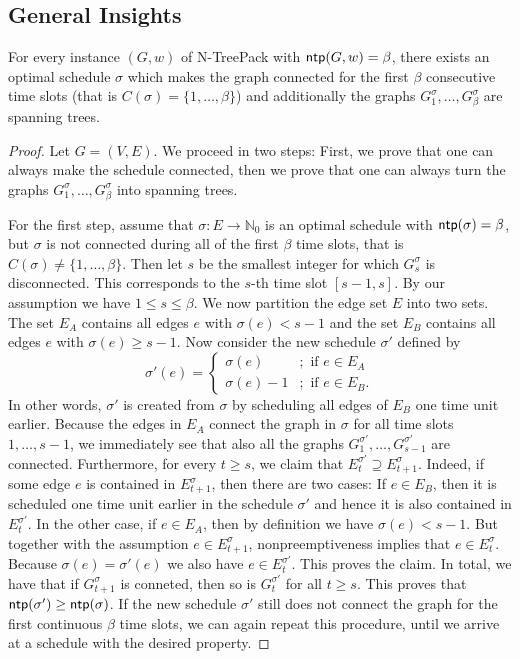 \documentclass[runningheads]{llncs}
\newcommand{\NN}{\mathbb{N}}
\newcommand{\set}[1]{\{ #1 \}}
\newcommand{\fromto}[2]{\set{#1, \ldots, #2}}
\newcommand{\xxxNTP}{{\sc N-TreePack}}
\DeclareMathOperator{\ntp}{\text{\sf ntp}}
\newcommand{\lasse}[1]{#1}
\begin{document}
\subsection{\lasse{General Insights}}

\begin{lemma}
\label{le:structure}
For every instance $(G,w)$ of {\xxxNTP} with $\ntp(G,w)=\lasse{\beta}$, there exists an optimal schedule $\sigma$ 
\lasse{which makes the graph connected for the first $\beta$ consecutive time slots (that is $C(\sigma) = \fromto{1}{\beta}$)} and additionally the graphs $G^\sigma_1,\ldots,G^\sigma_\beta$ are \lasse{spanning} trees.
\end{lemma}

\begin{proof}
\lasse{
Let $G = (V,E)$. We proceed in two steps: First, we prove that one can always make the schedule connected, then we prove that one can always turn the graphs $G^\sigma_1,\ldots,G^\sigma_\beta$ into spanning trees.
}

\lasse{
For the first step, assume that $\sigma : E \rightarrow \NN_0$ is an optimal schedule with $\ntp(\sigma) = \beta$, but $\sigma$ is not connected during all of the first $\beta$ time slots, that is $C(\sigma) \neq \fromto{1}{\beta}$.
 Then let $s$ be the smallest integer for which $G^\sigma_s$ is disconnected.
  This corresponds to the $s$-th time slot $[s-1,s]$. By our assumption we have $1 \leq s \leq \beta$. We now partition the edge set $E$ into two sets. The set $E_A$ contains all edges $e$ with $\sigma(e) < s-1$ and the set $E_B$ contains all edges $e$ with $\sigma(e) \geq s-1$. Now consider the new schedule $\sigma'$ defined by
\[
\sigma'(e) = \begin{cases} \sigma(e) &;\text{ if } e \in E_A\\
\sigma(e) - 1&;\text{ if } e \in E_B.
\end{cases}
\]
In other words, $\sigma'$ is created from $\sigma$ by scheduling all edges of $E_B$ one time unit earlier. 
Because the edges in $E_A$ connect the graph in $\sigma$ for all time slots $1,\ldots,s-1$, we immediately see that also all the graphs $G_1^{\sigma'},\ldots,G^{\sigma'}_{s-1}$ are connected. 
Furthermore, for every $t \geq s$, we claim that $E^{\sigma'}_t \supseteq E^\sigma_{t+1}$. 
Indeed, if some edge $e$ is contained in $E^\sigma_{t+1}$, then there are two cases: 
If $e \in E_B$, then it is scheduled one time unit earlier in the schedule $\sigma'$ and hence it is also contained in $E^{\sigma'}_t$. 
In the other case, if $e \in E_A$, then by definition we have $\sigma(e) < s-1$. 
But together with the assumption $e \in E^\sigma_{t+1}$, nonpreemptiveness implies that $e \in E^\sigma_t$. 
Because $\sigma(e) = \sigma'(e)$ we also have $e \in E^{\sigma'}_t$. This proves the claim. In total, we have that if $G^\sigma_{t+1}$ is conneted, then so is $G^{\sigma'}_{t}$ for all $t \geq s$. This proves that $\ntp(\sigma') \geq \ntp(\sigma)$.
 If the new schedule $\sigma'$ still does not connect the graph for the first continuous $\beta$ time slots, we can again repeat this procedure, until we arrive at a schedule with the desired property.
}


\end{proof}
\end{document}
